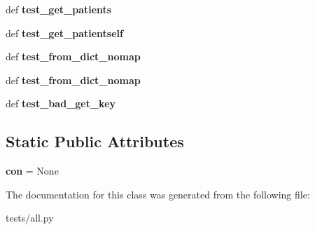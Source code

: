 \begin{DoxyCompactItemize}
\item 
\hypertarget{classtests_1_1all_1_1main__test_a544c867960638ac4be4302b6b968a1f4}{def {\bfseries test\-\_\-get\-\_\-patients}}\label{classtests_1_1all_1_1main__test_a544c867960638ac4be4302b6b968a1f4}

\item 
\hypertarget{classtests_1_1all_1_1main__test_a9f35cb8ae69eb78360f991e5e3245945}{def {\bfseries test\-\_\-get\-\_\-patientself}}\label{classtests_1_1all_1_1main__test_a9f35cb8ae69eb78360f991e5e3245945}

\item 
\hypertarget{classtests_1_1all_1_1main__test_af6a0e92e31ffa992c0466de2046709f0}{def {\bfseries test\-\_\-from\-\_\-dict\-\_\-nomap}}\label{classtests_1_1all_1_1main__test_af6a0e92e31ffa992c0466de2046709f0}

\item 
\hypertarget{classtests_1_1all_1_1main__test_af6a0e92e31ffa992c0466de2046709f0}{def {\bfseries test\-\_\-from\-\_\-dict\-\_\-nomap}}\label{classtests_1_1all_1_1main__test_af6a0e92e31ffa992c0466de2046709f0}

\item 
\hypertarget{classtests_1_1all_1_1main__test_ad1c1d8e93fc850e4919598f97e0bf4b6}{def {\bfseries test\-\_\-bad\-\_\-get\-\_\-key}}\label{classtests_1_1all_1_1main__test_ad1c1d8e93fc850e4919598f97e0bf4b6}

\end{DoxyCompactItemize}
\subsection*{Static Public Attributes}
\begin{DoxyCompactItemize}
\item 
\hypertarget{classtests_1_1all_1_1main__test_a57fb15f006c62f0e6107b550ff0cfc37}{{\bfseries con} = None}\label{classtests_1_1all_1_1main__test_a57fb15f006c62f0e6107b550ff0cfc37}

\end{DoxyCompactItemize}


The documentation for this class was generated from the following file\-:\begin{DoxyCompactItemize}
\item 
tests/all.\-py\end{DoxyCompactItemize}

